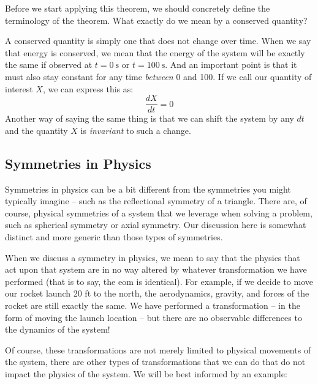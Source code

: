 Before we start applying this theorem, we should concretely define the terminology of the theorem. What exactly do we mean by a conserved quantity?

A conserved quantity is simply one that does not change over time. When we say that energy is conserved, we mean that the energy of the system will be exactly the same if observed at $t=0\ \mathrm{s}$ or $t=100\ \mathrm{s}$. And an important point is that it must also stay constant for any time \textit{between} 0 and 100. If we call our quantity of interest $X$, we can express this as:
$$\frac{dX}{dt}=0$$
Another way of saying the same thing is that we can shift the system by any $dt$ and the quantity $X$ is \textit{invariant} to such a change.

\subsection{Symmetries in Physics}

Symmetries in physics can be a bit different from the symmetries you might typically imagine -- such as the reflectional symmetry of a triangle. There are, of course, physical symmetries of a system that we leverage when solving a problem, such as spherical symmetry or axial symmetry. Our discussion here is somewhat distinct and more generic than those types of symmetries.

When we discuss a symmetry in physics, we mean to say that the physics that act upon that system are in no way altered by whatever transformation we have performed (that is to say, the \gls{eom} is identical). For example, if we decide to move our rocket launch 20 ft to the north, the aerodynamics, gravity, and forces of the rocket are still exactly the same. We have performed a transformation -- in the form of moving the launch location -- but there are no observable differences to the dynamics of the system!

Of course, these transformations are not merely limited to physical movements of the system, there are other types of transformations that we can do that do not impact the physics of the system. We will be best informed by an example:

